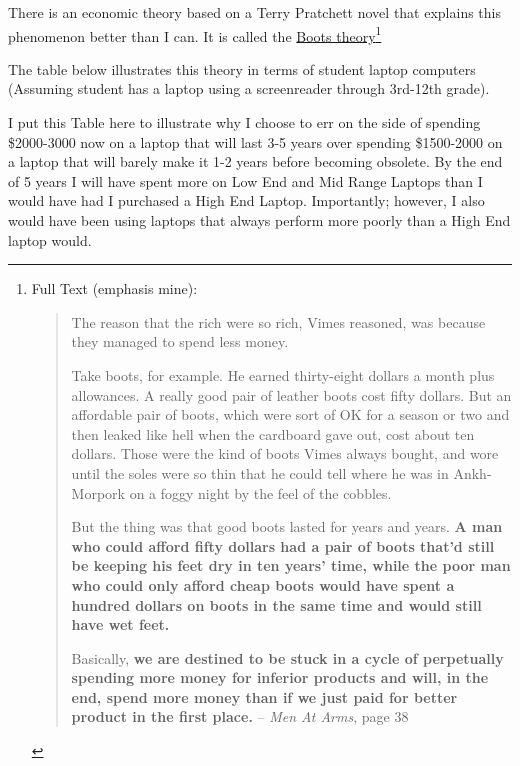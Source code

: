 \documentclass[14pt, letterpaper,twoside]{extreport}
\begin{document}
There is an economic theory based on a Terry Pratchett novel that explains this phenomenon better than I can. It is called the \href{https://en.wikipedia.org/wiki/Boots_theory}{Boots theory}\footnote{Full Text (emphasis mine):
	\begin{quote}The reason that the rich were so rich, Vimes reasoned, was because they managed to spend less money.

		Take boots, for example. He earned thirty-eight dollars a month plus allowances. A really good pair of leather boots cost fifty dollars. But an affordable pair of boots, which were sort of OK for a season or two and then leaked like hell when the cardboard gave out, cost about ten dollars. Those were the kind of boots Vimes always bought, and wore until the soles were so thin that he could tell where he was in Ankh-Morpork on a foggy night by the feel of the cobbles.

		But the thing was that good boots lasted for years and years. \textbf{A man who could afford fifty dollars had a pair of boots that’d still be keeping his feet dry in ten years’ time, while the poor man who could only afford cheap boots would have spent a hundred dollars on boots in the same time and would still have wet feet.}

		Basically, \textbf{we are destined to be stuck in a cycle of perpetually spending more money for inferior products and will, in the end, spend more money than if we just paid for better product in the first place.} -- \textit{Men At Arms}, page 38
	\end{quote} }

\hfill \break The table below illustrates this theory in terms of student laptop computers (Assuming student has a laptop using a screenreader through 3rd-12th grade).

I put this Table here to illustrate why I choose to err on the side of spending \$2000-3000 now on a laptop that will last 3-5 years over spending \$1500-2000 on a laptop that will barely make it 1-2 years before becoming obsolete. By the end of 5 years I will have spent more on Low End and Mid Range Laptops than I would have had I purchased a High End Laptop. Importantly; however, I also would have been using laptops that always perform more poorly than a High End laptop would.
\end{document}
